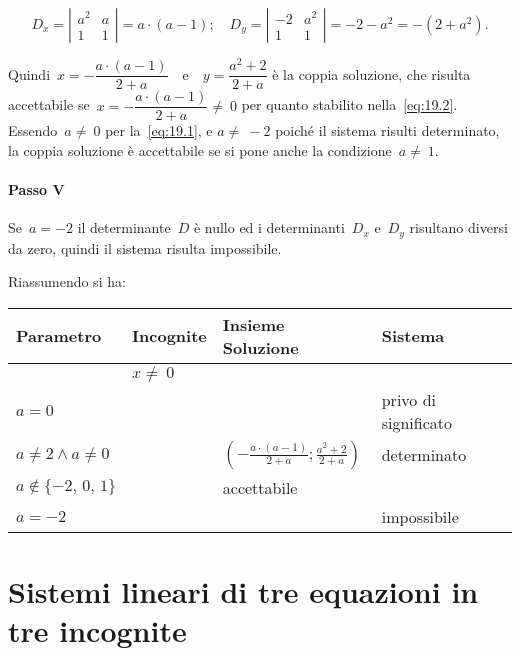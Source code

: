 \begin{exrig}
\begin{esempio}
\[D_{x}=\left|\begin{array}{cc}a^{2}&{a}\\{1}&{1}\end{array}\right|=a\cdot (a-1);\quad
D_{y}=\left|\begin{array}{cc}-2&a^{2}\\1& 1\end{array}\right|=-2-a^{2}=-(2+a^{2}).\]

Quindi~$x=-{\dfrac{a\cdot (a-1)}{2+a}}$~~e~~$y=\dfrac{a^{2}+2}{2+a}$ è la coppia soluzione, che risulta accettabile
se~$x=-{\dfrac{a\cdot (a-1)}{2+a}}\neq~0$ per quanto stabilito nella~\ref{eq:19.2}. Essendo~$a\neq~0$
per la~\ref{eq:19.1}, e $a\neq~-2$ poiché il sistema risulti determinato, la coppia soluzione è accettabile se si pone anche la condizione~$a\neq~1$.

\paragraph{Passo V} Se~$a=-2$ il determinante~$D$ è nullo ed
i determinanti~$D_{x}$ e~$D_{y}$ risultano diversi
da zero, quindi il sistema risulta impossibile.

Riassumendo si ha:

\begin{center}
\begin{tabularx}{.9\textwidth}{XXll}
\toprule
Parametro & Incognite & Insieme Soluzione & Sistema\\
\midrule
 & $x\neq~0$ & & \\
 $a=0$ & & & privo di significato\\
 $a\neq 2 \wedge a\neq 0$ & & $\left(-{\frac{a\cdot (a-1)}{2+a}};\frac{a^{2}+2}{2+a}\right)$ & determinato\\
 $a\notin \{-2\text{,~}0\text{,~}1\}$ & & accettabile & \\
$a=-2$ & & & impossibile\\
\bottomrule
\end{tabularx}
\end{center}
 \end{esempio}
\end{exrig}

\ovalbox{\risolvii \ref{ese:19.52}, \ref{ese:19.53}, \ref{ese:19.54}, \ref{ese:19.55}, \ref{ese:19.56}, \ref{ese:19.57}, \ref{ese:19.58}}

\section{Sistemi lineari di tre equazioni in tre incognite}

